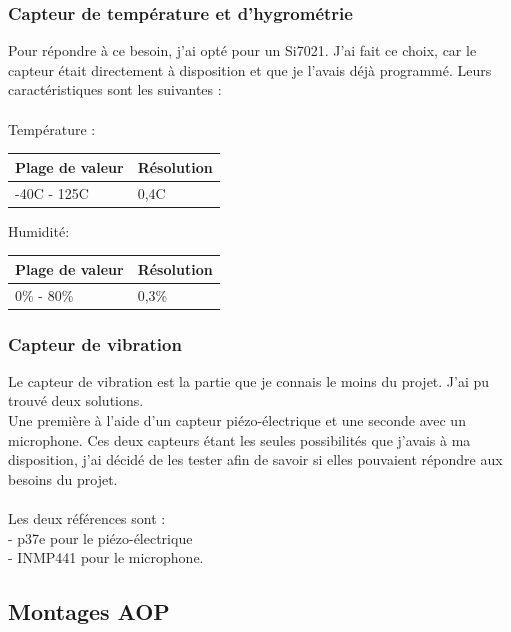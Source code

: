\documentclass[11pt,french,a4paper]{article}
\begin{document}
\subsubsection{Capteur de température et d'hygrométrie }
Pour répondre à ce besoin, j'ai opté pour un Si7021. J'ai fait ce choix, car le capteur était directement à disposition et que je l'avais déjà programmé. Leurs caractéristiques sont les suivantes :\\
\\
Température :\\
\begin{center}
    \begin{tabular}{|l|l|}
	\hline
	    Plage de valeur & Résolution \\
	\hline
	    -40C - 125C & 0,4C \\
	\hline
    \end{tabular}
\end{center}
Humidité:\\
\begin{center}
    \begin{tabular}{|l|l|}
	\hline
	    Plage de valeur & Résolution \\
	\hline
	    0\% - 80\% & 0,3\% \\
	\hline
    \end{tabular}
\end{center}

\subsubsection{Capteur de vibration}
Le capteur de vibration est la partie que je connais le moins du projet. J'ai pu trouvé deux solutions.\\
 Une première à l'aide d'un capteur piézo-électrique et une seconde avec un  microphone. Ces deux capteurs étant les seules possibilités que j'avais à ma disposition, 
 j'ai décidé de les tester afin de savoir si elles pouvaient répondre aux besoins du projet.\\
\\
 Les deux références sont :\\
- p37e pour le piézo-électrique\\
- INMP441 pour le microphone.\\

\subsection{Montages AOP}
\end{document}
